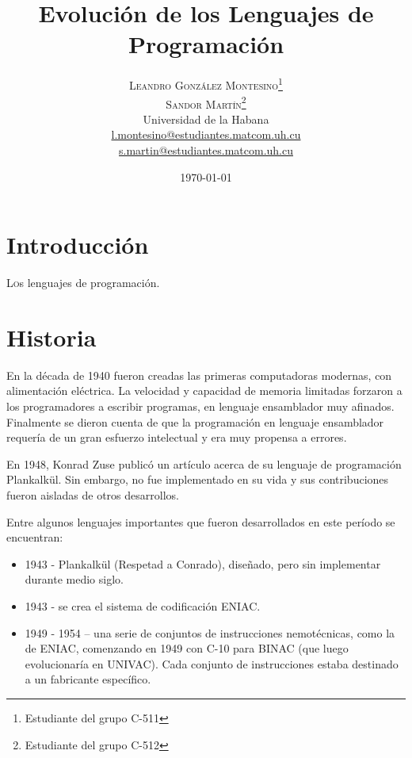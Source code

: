 \documentclass[twoside,twocolumn]{article}
\title{Evolución de los Lenguajes de Programación} %
\author{%
\textsc{Leandro González Montesino}\thanks{Estudiante del grupo C-511} \\[1ex] %
\textsc{Sandor Martín}\thanks{Estudiante del grupo C-512} \\[1ex]
\normalsize Universidad de la Habana \\ %
\normalsize \href{mailto:l.montesino@estudiantes.matcom.uh.cu}{l.montesino@estudiantes.matcom.uh.cu}\\ %
\normalsize \href{mailto:s.martin@estudiantes.matcom.uh.cu}{s.martin@estudiantes.matcom.uh.cu}
}
\date{\today} %
\begin{document}
\maketitle


\section{Introducción}

\lettrine[nindent=0em,lines=3]{L} os lenguajes de programación.



\section{Historia}

En la década de 1940 fueron creadas las primeras computadoras modernas, con alimentación eléctrica. La velocidad y capacidad de memoria limitadas forzaron a los programadores a escribir programas, en lenguaje ensamblador muy afinados. Finalmente se dieron cuenta de que la programación en lenguaje ensamblador requería de un gran esfuerzo intelectual y era muy propensa a errores.

En 1948, Konrad Zuse publicó un artículo acerca de su lenguaje de programación Plankalkül. Sin embargo, no fue implementado en su vida y sus contribuciones fueron aisladas de otros desarrollos.

Entre algunos lenguajes importantes que fueron desarrollados en este período se encuentran: 
\begin{itemize}
\item     1943 - Plankalkül (Respetad a Conrado), diseñado, pero sin implementar durante medio siglo.
\item   1943 - se crea el sistema de codificación ENIAC.
\item  1949 - 1954 -- una serie de conjuntos de instrucciones nemotécnicas, como la de ENIAC, comenzando en 1949 con C-10 para BINAC (que luego evolucionaría en UNIVAC). Cada conjunto de instrucciones estaba destinado a un fabricante específico.
\end{itemize}




\end{document}
